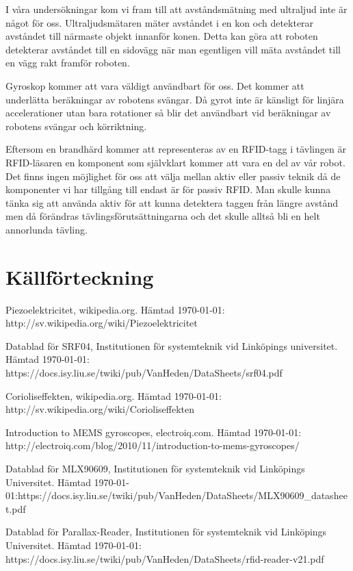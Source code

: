 \documentclass[a4paper,12pt,fleqn]{article}
\begin{document}
I våra undersökningar kom vi fram till att avståndsmätning med ultraljud inte är något för oss. Ultraljudsmätaren mäter avståndet i en kon och detekterar avståndet till närmaste objekt innanför konen. Detta kan göra att roboten detekterar avståndet till en sidovägg när man egentligen vill mäta avståndet till en vägg rakt framför roboten.

Gyroskop kommer att vara väldigt användbart för oss. Det kommer att underlätta beräkningar av robotens svängar. Då gyrot inte är känsligt för linjära accelerationer utan bara rotationer så blir det användbart vid beräkningar av robotens svängar och körriktning.

Eftersom en brandhärd kommer att representeras av en RFID-tagg i tävlingen är RFID-läsaren en komponent som självklart kommer att vara en del av vår robot. Det finns ingen möjlighet för oss att välja mellan aktiv eller passiv teknik då de komponenter vi har tillgång till endast är för passiv RFID. Man skulle kunna tänka sig att använda aktiv för att kunna detektera taggen från längre avstånd men då förändras tävlingsförutsättningarna och det skulle alltså bli en helt annorlunda tävling.


\section{Källförteckning}

Piezoelektricitet, wikipedia.org. Hämtad \today:\newline
http://sv.wikipedia.org/wiki/Piezoelektricitet

Datablad för SRF04, Institutionen för systemteknik vid Linköpings universitet. Hämtad \today:\newline
https://docs.isy.liu.se/twiki/pub/VanHeden/DataSheets/srf04.pdf

Corioliseffekten, wikipedia.org. Hämtad \today:\newline
http://sv.wikipedia.org/wiki/Corioliseffekten

Introduction to MEMS gyroscopes, electroiq.com. Hämtad \today:\newline
http://electroiq.com/blog/2010/11/introduction-to-mems-gyroscopes/

Datablad för MLX90609, Institutionen för systemteknik vid Linköpings Universitet. Hämtad \today:\newline https://docs.isy.liu.se/twiki/pub/VanHeden/DataSheets/MLX90609_datasheet.pdf

Datablad för Parallax-Reader, Institutionen för systemteknik vid Linköpings Universitet. Hämtad \today:\newline
https://docs.isy.liu.se/twiki/pub/VanHeden/DataSheets/rfid-reader-v21.pdf
\end{document}
